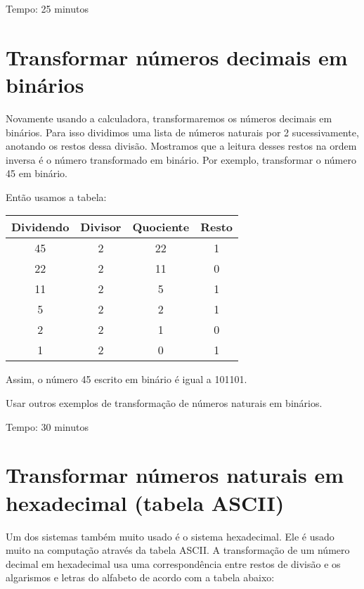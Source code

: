 \documentclass[12pt, openright, a4paper, brazil, openany, oneside]{abntex2}
\begin{document}
Tempo: 25 minutos

\section{Transformar números decimais em binários}
Novamente usando a calculadora, transformaremos os números decimais em binários. Para isso dividimos uma lista de números naturais por 2 sucessivamente, anotando os restos dessa divisão. Mostramos que a leitura desses restos na ordem inversa é o número transformado em binário. Por exemplo, transformar o número 45 em binário.

\begin{figure}[h]

    \center


\end{figure}


Então usamos a tabela:

 \begin{table}[h]
        \centering
        \begin{tabular}{|c|c|c|c|}
            \hline
            Dividendo & Divisor & Quociente & Resto \\
            \hline
            45 & 2 & 22 & 1 \\
            \hline
            22 & 2 & 11 & 0 \\
            \hline
            11 & 2 & 5 & 1 \\
            \hline
            5 & 2 & 2 & 1 \\
            \hline
            2 & 2 & 1 & 0 \\
            \hline
            1 & 2 & 0 & 1 \\
            \hline
        \end{tabular}
    \end{table}
Assim, o número 45 escrito em binário é igual a 101101.

Usar outros exemplos de transformação de números naturais em binários.

Tempo: 30 minutos


\section{Transformar números naturais em hexadecimal (tabela ASCII)}

Um dos sistemas também muito usado é o sistema hexadecimal. Ele é usado muito na computação através da tabela ASCII. A transformação de um número decimal em hexadecimal usa uma correspondência entre restos de divisão e os algarismos e letras do alfabeto de acordo com a tabela abaixo:
\end{document}
